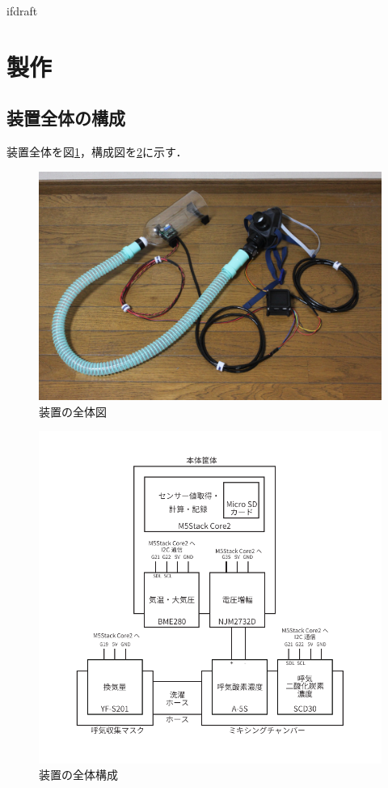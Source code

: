 \expandafter\ifx\csname ifdraft\endcsname\relax
 
\fi

\section{製作}

\subsection{装置全体の構成}

装置全体を図\ref{fig:overall_view}，構成図を\ref{fig:connection_map}に示す．

\begin{figure}[H]
  \begin{center}
    \includegraphics[width=12cm]{fig/overall_view}
    \caption{装置の全体図}
    \label{fig:overall_view}
  \end{center}
\end{figure}

\begin{figure}[H]
  \begin{center}
    \includegraphics[width=12cm]{fig/connection_map}
    \caption{装置の全体構成}
    \label{fig:connection_map}
  \end{center}
\end{figure}

